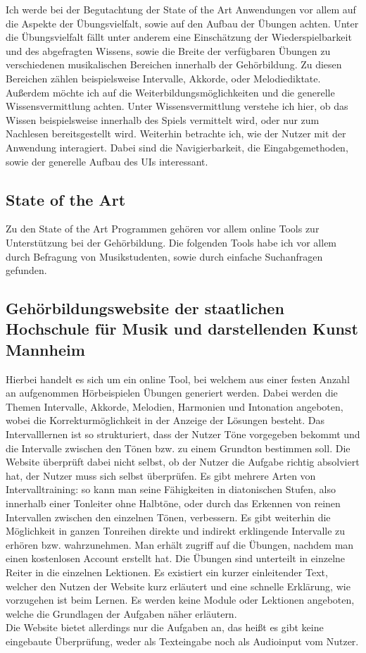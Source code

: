 Ich werde bei der Begutachtung der State of the Art Anwendungen vor allem auf die Aspekte der Übungsvielfalt, sowie auf den Aufbau der Übungen achten. Unter die Übungsvielfalt fällt unter anderem eine Einschätzung der Wiederspielbarkeit und des abgefragten Wissens, sowie die Breite der verfügbaren Übungen zu verschiedenen musikalischen Bereichen innerhalb der Gehörbildung. Zu diesen Bereichen zählen beispielsweise Intervalle, Akkorde, oder Melodiediktate.
Außerdem möchte ich auf die Weiterbildungsmöglichkeiten und die generelle Wissensvermittlung achten. Unter Wissensvermittlung verstehe ich hier, ob das Wissen beispielsweise innerhalb des Spiels vermittelt wird, oder nur zum Nachlesen bereitsgestellt wird. 
Weiterhin betrachte ich, wie der Nutzer mit der Anwendung interagiert. Dabei sind die Navigierbarkeit, die Eingabgemethoden, sowie der generelle Aufbau des UIs interessant. 

\subsection{State of the Art}

Zu den State of the Art Programmen gehören vor allem online Tools zur Unterstützung bei der Gehörbildung. Die folgenden Tools habe ich vor allem durch Befragung von Musikstudenten, sowie durch einfache Suchanfragen gefunden.

\subsection*{Gehörbildungswebsite der staatlichen Hochschule für Musik und darstellenden Kunst Mannheim}
\label{sec:Mannheim}
Hierbei handelt es sich um ein online Tool, bei welchem aus einer festen Anzahl an aufgenommen Hörbeispielen Übungen generiert werden.
Dabei werden die Themen Intervalle, Akkorde, Melodien, Harmonien und Intonation angeboten, wobei die Korrekturmöglichkeit in der Anzeige der Lösungen besteht. Das Intervalllernen ist so strukturiert, dass der Nutzer Töne vorgegeben bekommt
und die Intervalle zwischen den Tönen bzw. zu einem Grundton bestimmen soll. Die Website überprüft dabei nicht selbst, ob der Nutzer die Aufgabe richtig absolviert hat, der Nutzer muss sich selbst überprüfen. 
Es gibt mehrere Arten von Intervalltraining: so kann man seine Fähigkeiten in diatonischen Stufen, also innerhalb einer Tonleiter ohne Halbtöne, oder durch das Erkennen von reinen Intervallen zwischen den einzelnen Tönen, verbessern. Es gibt weiterhin die Möglichkeit in ganzen Tonreihen
direkte und indirekt erklingende Intervalle zu erhören bzw. wahrzunehmen. Man erhält zugriff auf die Übungen, nachdem man einen kostenlosen Account 
erstellt hat. Die Übungen sind unterteilt in einzelne Reiter in die einzelnen Lektionen. Es existiert ein kurzer einleitender Text, welcher den Nutzen der Website kurz erläutert und eine schnelle Erklärung, wie vorzugehen ist beim Lernen. Es werden keine Module oder Lektionen angeboten, welche die Grundlagen der Aufgaben näher erläutern.\\
Die Website bietet allerdings nur die Aufgaben an, das heißt es gibt keine eingebaute Überprüfung, weder als Texteingabe noch als Audioinput vom Nutzer. \cite{hfmdk_mannheim}

